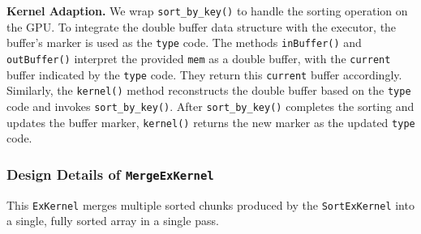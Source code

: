 \begin{comment}
The input is mapped into a few continuous chunks to fit inside the on-GPU buffer, as shown in Figure~\ref{fig:sort-flow}.
Assume that we are sorting 2 billion 8-byte integers using MI100 in this example.
As we described in \S\ref{sec:executor}, the size of the memory buffer that holds the input and output is 16GB.
Thus, we can sort 8GB data at a time, which contains 500M 8-byte integers, and process 4 chunks.
The output array on the CPU is mapped identically, and each chunk will be filled with a sorted sub-array.
\end{comment}

\noindent
\textbf{Kernel Adaption.}
We wrap \texttt{sort\_by\_key()} to handle the sorting operation on the GPU.
To integrate the double buffer data structure with the executor, the buffer's marker is used as the \texttt{type} code. 
The methods \texttt{inBuffer()} and \texttt{outBuffer()} interpret the provided \texttt{mem} as a double buffer, with the \texttt{current} buffer indicated by the \texttt{type} code. 
They return this \texttt{current} buffer accordingly. 
Similarly, the \texttt{kernel()} method reconstructs the double buffer based on the \texttt{type} code and invokes \texttt{sort\_by\_key()}. 
After \texttt{sort\_by\_key()} completes the sorting and updates the buffer marker, \texttt{kernel()} returns the new marker as the updated \texttt{type} code.

\begin{comment}
We wrap \texttt{sort\_by\_key()} to sort data on GPU.
To bridge the double buffer data structure to the executor, the marker of the double buffer will be used as the \texttt{type} code.
Both \texttt{inBuffer()} and \texttt{outBuffer()} will interpret the given \texttt{mem} as a double buffer whose \texttt{current} is pointed by the \texttt{type} code, and return the \texttt{current}.
Similar, \texttt{kernel()} reconstructs the double buffer by \texttt{type}, and invoke \texttt{sort\_by\_key()}.
After \texttt{sort\_by\_key()} changes the marker of the provided double buffer, \texttt{kernel()} returns that changed marker as the new \texttt{type} code.
\end{comment}


\subsubsection{\textbf{Design Details of \texttt{MergeExKernel}}}
This \texttt{ExKernel} merges multiple sorted chunks produced by the \texttt{SortExKernel} into a single, fully sorted array in a single pass.


